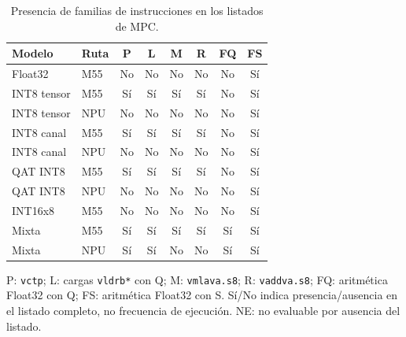 \begin{table}[H]\centering\small
\caption{Presencia de familias de instrucciones en los listados de MPC.}\label{tab:helium_mpc}
\begin{tabularx}{\linewidth}{Xlcccccc}\toprule
Modelo & Ruta & P & L & M & R & FQ & FS\\\midrule
Float32 & M55 & No & No & No & No & No & Sí\\
INT8 tensor & M55 & Sí & Sí & Sí & Sí & No & Sí\\
INT8 tensor & NPU & No & No & No & No & No & Sí\\
INT8 canal & M55 & Sí & Sí & Sí & Sí & No & Sí\\
INT8 canal & NPU & No & No & No & No & No & Sí\\
QAT INT8 & M55 & Sí & Sí & Sí & Sí & No & Sí\\
QAT INT8 & NPU & No & No & No & No & No & Sí\\
INT16x8 & M55 & No & No & No & No & No & Sí\\
Mixta & M55 & Sí & Sí & Sí & Sí & Sí & Sí\\
Mixta & NPU & Sí & Sí & No & No & Sí & Sí\\
\bottomrule\end{tabularx}
\par\smallskip\begin{minipage}{\linewidth}\footnotesize P: \texttt{vctp}; L: cargas \texttt{vldrb*} con Q; M: \texttt{vmlava.s8}; R: \texttt{vaddva.s8}; FQ: aritmética Float32 con Q; FS: aritmética Float32 con S. Sí/No indica presencia/ausencia en el listado completo, no frecuencia de ejecución. NE: no evaluable por ausencia del listado.\end{minipage}
\end{table}
